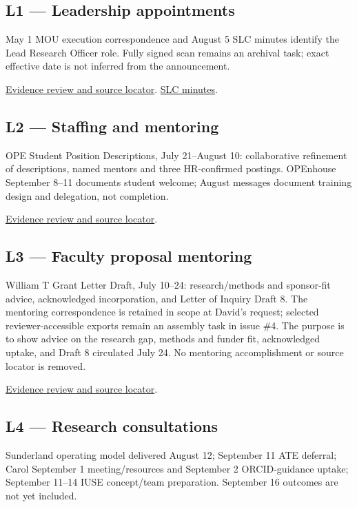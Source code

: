 \hypertarget{evidence-L1}{}
\subsection{L1 --- Leadership appointments}
May 1 MOU execution correspondence and August 5 SLC minutes identify the Lead Research Officer role. Fully signed scan remains an archival task; exact effective date is not inferred from the announcement.

\href{https://github.com/molikd/Molik-Tenure-Document/issues/4#issuecomment-5683515539}{Evidence review and source locator}.
\href{https://staffnet.atlassian.net/wiki/spaces/SLC/pages/1388150788/2026-08-05+SLC+Meeting+Notes}{SLC minutes}.

\hypertarget{evidence-L2}{}
\subsection{L2 --- Staffing and mentoring}
OPE Student Position Descriptions, July 21--August 10: collaborative refinement of descriptions, named mentors and three HR-confirmed postings. OPEnhouse September 8--11 documents student welcome; August messages document training design and delegation, not completion.

\href{https://github.com/molikd/Molik-Tenure-Document/issues/4#issuecomment-5683752795}{Evidence review and source locator}.

\hypertarget{evidence-L3}{}
\subsection{L3 --- Faculty proposal mentoring}
William T Grant Letter Draft, July 10--24: research/methods and sponsor-fit advice, acknowledged incorporation, and Letter of Inquiry Draft 8. The mentoring correspondence is retained in scope at David's request; selected reviewer-accessible exports remain an assembly task in issue \#4. The purpose is to show advice on the research gap, methods and funder fit, acknowledged uptake, and Draft 8 circulated July 24. No mentoring accomplishment or source locator is removed.

\href{https://github.com/molikd/Molik-Tenure-Document/issues/4#issuecomment-5683752795}{Evidence review and source locator}.

\hypertarget{evidence-L4}{}
\subsection{L4 --- Research consultations}
Sunderland operating model delivered August 12; September 11 ATE deferral; Carol September 1 meeting/resources and September 2 ORCID-guidance uptake; September 11--14 IUSE concept/team preparation. September 16 outcomes are not yet included.

